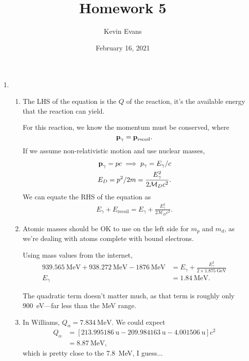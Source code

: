 \documentclass{homework}
\title{Homework 5}
\author{Kevin Evans}
\date{February 16, 2021}
\begin{document}
	\maketitle
	\begin{enumerate}
		\item \begin{enumerate}
			\item The LHS of the equation is the $Q$ of the reaction, it's the available energy that the reaction can yield. 
			
			For this reaction, we know the momentum must be conserved, where $$\boldsymbol{\mathrm{p}}_\gamma = \boldsymbol{\mathrm{p}}_\mathrm{recoil}.$$
			If we assume non-relativistic motion and use nuclear masses, \begin{align*}
				\boldsymbol{\mathrm{p}}_\gamma = pc \implies p_\gamma = E_\gamma / c \\
				E_{D} = p^2 / 2m = \frac{ E_\gamma^2 }{2 \mathcal{M}_D c^2}.
			\end{align*}
			We can equate the RHS of the equation as \begin{align*}
				E_\gamma + E_\mathrm{recoil} = E_\gamma + \frac{ E_\gamma^2 }{2 \mathcal{M}_D c^2}.
			\end{align*}
			
			\item Atomic masses should be OK to use on the left side for $m_p$ and $m_d$, as we're dealing with atoms complete with bound electrons.
			
			Using mass values from the internet, \begin{align*}
					\SI{939.565}{\MeV}
					+ \SI{938.272}{\MeV}
					- \SI{1876}{\MeV} & = E_\gamma + \frac{ E_\gamma^2 }{2 \times \SI{1.875}{\GeV}} \\
					E_\gamma & = \SI{1.84}{\MeV}.
			\end{align*}

			The quadratic term doesn't matter much, as that term is roughly only \SI{900}{\eV}---far less than the \si{\MeV} range.
			
			\item In Williams, $Q_\alpha = \SI{7.834}{\MeV}$. 
				We could expect \begin{align*}
					Q_\alpha & = \left[\SI{213.995186}{\atomicmassunit} - \SI{209.984163}{\atomicmassunit} - \SI{4.001506}{\atomicmassunit}\right]c^2 \\
						& = \SI{8.87}{\MeV},
				\end{align*}
				which is pretty close to the \SI{7.8}{\MeV}, I guess...
				

\end{enumerate}
\end{enumerate}
\end{document}
